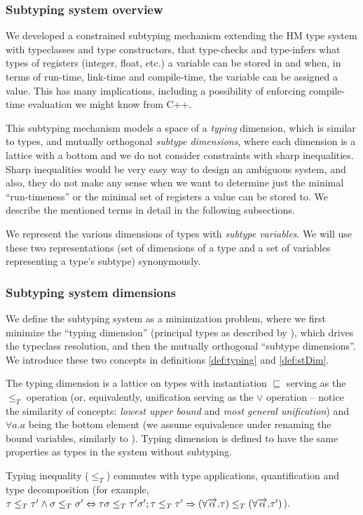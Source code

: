 \subsubsection{Subtyping system overview}

We developed a constrained subtyping mechanism extending the HM type system with typeclasses and type constructors, that type-checks and type-infers what types of registers (integer, float, etc.) a variable can be stored in and when, in terms of run-time, link-time and compile-time, the variable can be assigned a value. This has many implications, including a possibility of enforcing compile-time evaluation we might know from C++.

This subtyping mechanism models a space of a \emph{typing} dimension, which is similar to types, and mutually orthogonal \emph{subtype dimensions}, where each dimension is a lattice with a bottom and we do not consider constraints with sharp inequalities. Sharp inequalities would be very easy way to design an ambiguous system, and also, they do not make any sense when we want to determine just the minimal ``run-timeness'' or the minimal set of registers a value can be stored to. We describe the mentioned terms in detail in the following subsections.

We represent the various dimensions of types with \emph{subtype variables}. We will use these two representations (set of dimensions of a type and a set of variables representing a type's subtype) synonymously.

\subsubsection{Subtyping system dimensions}

We define the subtyping system as a minimization problem, where we first minimize the ``typing dimension'' (principal types as described by \citet{damas1982principal}), which drives the typeclass resolution, and then the mutually orthogonal ``subtype dimensions''. We introduce these two concepts in definitions \ref{def:typing} and \ref{def:stDim}.

\begin{defn}
    \label{def:typing}
    The typing dimension is a lattice on types with instantiation $\sqsubseteq$ serving as the $\leq_T$ operation (or, equivalently, unification serving as the $\lor$ operation -- notice the similarity of concepts: \emph{lowest upper bound} and \emph{most general unification}) and $\forall a . a$ being the bottom element (we assume equivalence under renaming the bound variables, similarly to \citet{barendregt1992lambda}). Typing dimension is defined to have the same properties as types in the system without subtyping.

    Typing inequality ($\leq_T$) commutes with type applications, quantification and type decomposition (for example, $\tau \leq_T \tau' \land \sigma \leq_T \sigma' \Leftrightarrow \tau \sigma \leq_T \tau' \sigma'; \tau \leq_T \tau' \Rightarrow (\forall \overrightarrow{\alpha} . \tau) \leq_T (\forall \overrightarrow{\alpha} . \tau')$).

\end{defn}

